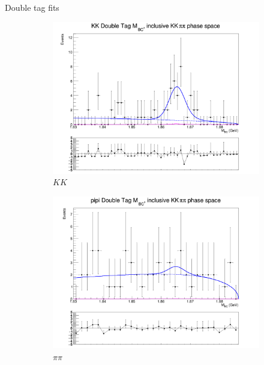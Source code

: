 \documentclass{beamer}
\begin{document}
\begin{frame}{Double tag fits}
  \begin{figure}
    \centering
    \begin{subfigure}{0.33\textwidth}
      \centering
      \includegraphics[width=1.0\textwidth]{Plots/DoubleTagYield_DoubleTag_CP_KKpipi_vs_KK_SignalBin0.png}
      \caption{$KK$}
    \end{subfigure}%
    \begin{subfigure}{0.33\textwidth}
      \centering
      \includegraphics[width=1.0\textwidth]{Plots/DoubleTagYield_DoubleTag_CP_KKpipi_vs_pipi_SignalBin0.png}
      \caption{$\pi\pi$}
    \end{subfigure}
    \begin{subfigure}{0.33\textwidth}

\end{subfigure}
\end{figure}
\end{frame}
\end{document}
